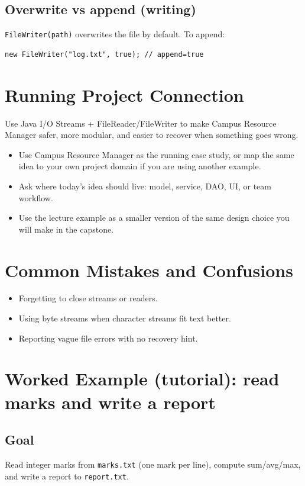 \documentclass[11pt]{article}
\begin{document}
\subsection{Overwrite vs append (writing)}
\texttt{FileWriter(path)} overwrites the file by default.
To append:
\begin{lstlisting}
new FileWriter("log.txt", true); // append=true
\end{lstlisting}
\notesources{\OOPSUnitIIISources}

\section{Running Project Connection}
Use Java I/O Streams + FileReader/FileWriter to make Campus Resource Manager safer, more modular, and easier to recover when something goes wrong.
\begin{itemize}
  \item Use Campus Resource Manager as the running case study, or map the same idea to your own project domain if you are using another example.
  \item Ask where today's idea should live: model, service, DAO, UI, or team workflow.
  \item Use the lecture example as a smaller version of the same design choice you will make in the capstone.
\end{itemize}
\notesources{\OOPSUnitIIISources}

\section{Common Mistakes and Confusions}
\begin{itemize}
  \item Forgetting to close streams or readers.
  \item Using byte streams when character streams fit text better.
  \item Reporting vague file errors with no recovery hint.
\end{itemize}
\notesources{\OOPSUnitIIISources}

\section{Worked Example (tutorial): read marks and write a report}
\subsection*{Goal}
Read integer marks from \texttt{marks.txt} (one mark per line), compute sum/avg/max, and write a report to \texttt{report.txt}.
\end{document}
